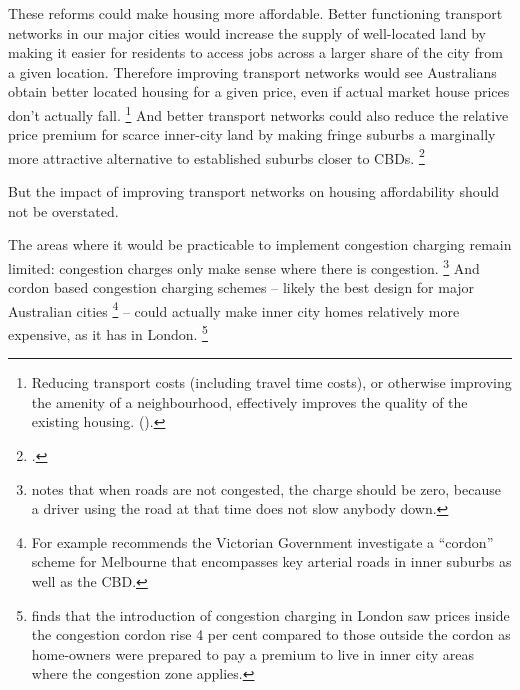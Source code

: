 These reforms could make housing more affordable. Better functioning transport networks in our major cities would increase the supply of well-located land by making it easier for residents to access jobs across a larger share of the city from a given location. Therefore improving transport networks would see Australians obtain better located housing for a given price, even if actual market house prices don't actually fall.%
    \footnote{Reducing transport costs (including travel time costs), or otherwise improving the amenity of a neighbourhood, effectively improves the quality of the existing housing. (\textcites[][6]{Abelson-2016-Housing-costs-policies}[][7]{Terrill-Emslie-2017-Value-capture}).} %
And better transport networks could also reduce the relative price premium for scarce inner-city land by making fringe suburbs a marginally more attractive alternative to established suburbs closer to CBDs.%
    \footcite[][25]{HousingAus17}

But the impact of improving transport networks on housing affordability should not be overstated. 

The areas where it would be practicable to implement congestion charging remain limited: congestion charges only make sense where there is congestion.%
    \footnote{\textcite[][41]{Terrill-2017-Road-congestion} notes that when roads are not congested, the charge should be zero, because a driver using the road at that time does not slow anybody down.} 
And cordon based congestion charging schemes -- likely the best design for major Australian cities%
    \footnote{For example \textcite[][41]{Terrill-2017-Road-congestion} recommends the Victorian Government investigate a ``cordon'' scheme for Melbourne that encompasses key arterial roads in inner suburbs as well as the CBD\@.}\space
-- could actually make inner city homes relatively more expensive, as it has in London.%
    \footnote{\textcite{Tang-2015-Traffic-Externalities-Housing-Prices} finds that the introduction of congestion charging in London saw prices inside the congestion cordon rise 4 per cent compared to those outside the cordon as home-owners were prepared to pay a premium to live in inner city areas where the congestion zone applies.} 


